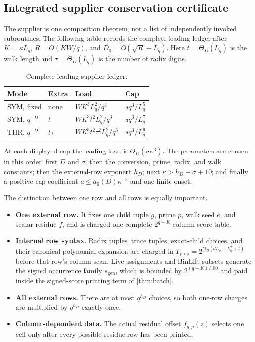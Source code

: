 \documentclass[11pt,letterpaper]{article}
\newcommand{\cref}[1]{\ref{#1}}
\theoremstyle{definition}
\theoremstyle{remark}
\begin{document}
\subsection{Integrated supplier conservation
certificate}\label{45-integrated-supplier-conservation-certificate}

The supplier is one composition theorem, not a list of independently
invoked subroutines. The following table records the complete leading
ledger after \(K=\kappa L_q\), \(R=O(KW/q)\), and
\(D_0=O(\sqrt R+L_q)\). Here \(t=\Theta_D(L_q)\) is the walk length and
\(\tau=\Theta_D(L_q)\) is the number of radix digits.

\begin{table}[t]
\centering
\caption{Complete leading supplier ledger.}
\label{tab:supplier-ledger}
\small
\begin{tabular}{@{}llll@{}}
\toprule
\textbf{Mode} & \textbf{Extra} & \textbf{Load} & \textbf{Cap} \\
\midrule
SYM, fixed & none & \(WK^3L_q^2/q^3\) & \(a q^3/L_q^5\) \\
SYM, \(q^{-D}\) & \(t\) & \(WK^3t^2L_q^2/q^3\) & \(a q^3/L_q^7\) \\
THR, \(q^{-D}\) & \(t\tau\) & \(WK^3t^2\tau^2L_q^2/q^3\) &
\(a q^3/L_q^9\) \\
\bottomrule
\end{tabular}
\end{table}

At each displayed cap the leading load is \(\Theta_D(a\kappa^3)\). The
parameters are chosen in this order: first \(D\) and \(\sigma\); then the
conversion, prime, radix, and walk constants; then the external-row exponent
\(h_D\); next \(\kappa>h_D+\sigma+10\); and finally a positive cap
coefficient \(a\le a_0(D)\kappa^{-3}\) and one finite onset.

The distinction between one row and all rows is equally important.

\begin{itemize}
\item
  \textbf{One external row.} It fixes one child tuple \(g\), prime
  \(p\), walk seed \(e\), and scalar residue \(f\), and is charged one
  complete \(2^{q-K}\)-column score table.
\item
  \textbf{Internal row syntax.} Radix tuples, trace tuples, exact-child
  choices, and their canonical polynomial expansion are charged in
  \(T_{\mathrm{prep}}=2^{O_D(dL_q+L_q^2+t)}\) before that
  row's column scan. Live assignments and BinLift subsets generate the
  signed occurrence family \(s_{\mathrm{gen}}\), which is bounded by
  \(2^{(q-K)/100}\) and paid inside the signed-score printing term of
  \cref{thm:batch}.
\item
  \textbf{All external rows.} There are at most \(q^{h_D}\) choices, so
  both one-row charges are multiplied by \(q^{h_D}\) exactly once.
\item
  \textbf{Column-dependent data.} The actual residual offset
  \(f_{g,p}(z)\) selects one cell only after every possible residue row
  has been printed.
\end{itemize}
\end{document}
